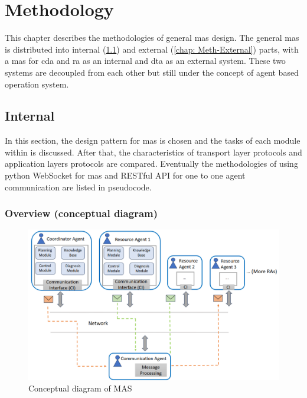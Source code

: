 \chapter{Methodology}\label{chap: Meth}%
This chapter describes the methodologies of general \gls{mas} design. 
The general \gls{mas} is distributed into internal (\ref{chap: Meth-Internal}) and external (\ref{chap: Meth-External}) parts,  
with a \gls{mas} for \gls{cda} and \gls{ra} as an internal and \gls{dta} as an external system. 
These two systems are decoupled from each other but still under the concept of agent based operation system. 
\section{Internal}\label{chap: Meth-Internal}
In this section, the design pattern for \gls{mas} is chosen and the tasks of each module within is discussed.
After that, the characteristics of transport layer protocols and application layers protocols are compared. 
Eventually the methodologies of using python WebSocket for \gls{mas} and RESTful API for one to one agent communication are listed in pseudocode. 

\subsection{Overview (conceptual diagram)}

\begin{figure}[htb]
\includegraphics[width=\textwidth]{figures/MAS_Conceptual_Diagram.png}
\centering
\caption{Conceptual diagram of MAS\label{fig: MASConceptual}}
\end{figure}


